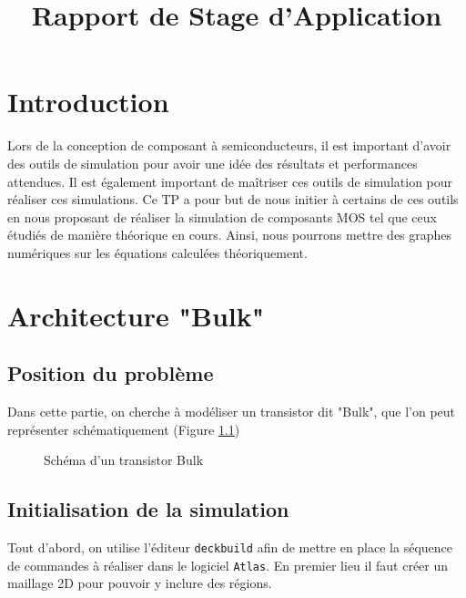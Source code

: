 \documentclass[a4paper,11pt]{report}
\title{Rapport de Stage d'Application}
\begin{document}


\chapter*{Introduction}
Lors de la conception de composant à semiconducteurs, il est important d'avoir des outils de simulation pour avoir une idée des résultats et performances attendues. Il est également important de maîtriser ces outils de simulation pour réaliser ces simulations. Ce TP a pour but de nous initier à certains de ces outils en nous proposant de réaliser la simulation de composants MOS tel que ceux étudiés de manière théorique en cours. Ainsi, nous pourrons mettre des graphes  numériques sur les équations calculées théoriquement.

\chapter{Architecture "Bulk"}

\section{Position du problème}
Dans cette partie, on cherche à modéliser un transistor dit "Bulk", que l'on peut représenter schématiquement (Figure \ref{SchemaBulk})
\begin{figure}[H]
    \centering
    \caption{Schéma d'un transistor Bulk}
    \label{SchemaBulk}
\end{figure}
\section{Initialisation de la simulation}

Tout d'abord, on utilise l'éditeur \texttt{deckbuild} afin de mettre en place la séquence de commandes à réaliser dans le logiciel \texttt{Atlas}. En premier lieu il faut créer un maillage 2D pour pouvoir y inclure des régions.
\vspace{0.3cm}
\end{document}

